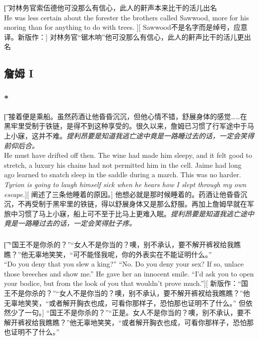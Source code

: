 \documentclass[12pt,a4paper]{article}
\begin{document}
\subsubsection{}\label{3.0.4}\t[
	对林务官索伍德他可没那么有信心，此人的鼾声本来比干的活儿出名\\
	He was less certain about the forester the brothers called Sawwood, more for his snoring than for anything to do with trees. ][
	Sawwood不是名字而是绰号，应意译。新版作：]
	对林务官“锯木响”他可没那么有信心，此人的鼾声比干的活儿更出名
	
	
\subsection{詹姆 I}
\subsubsection{\color{red}*}\t[
	接着便是乘船。虽然药酒让他昏昏沉沉，但他心情不错，舒展身体的感觉……在黑牢里受制于铁链，是得不到这种享受的。很久以来，詹姆已习惯了行军途中于马上小寐，这并不难。\emph{提利昂要是知道我逃亡途中竟是一路睡过去的话，一定会笑得前仰后合。}\\
	He must have drifted off then. The wine had made him sleepy, and it felt good to stretch, a luxury his chains had not permitted him in the cell. Jaime had long ago learned to snatch sleep in the saddle during a march. This was no harder. \emph{Tyrion is going to laugh himself sick when he hears how I slept through my own escape.}][
	阐述了三条他睡着的原因。]
	他想必就是那时候睡着的。药酒让他昏昏沉沉，不再受制于黑牢里的铁链，得以舒展身体又是那么舒服。再加上詹姆早就在军旅中习惯了马上小寐，船上可不至于比马上更难入眠。\emph{提利昂要是知道我逃亡途中竟是一路睡过去的话，一定会笑得肚子疼。}
	
\subsubsection{}\t[
	“国王不是你杀的？”“女人不是你当的？噢，别不承认，要不解开裤衩给我瞧瞧？”他无辜地笑笑，“可不能怪我呢，你的外表实在不能证明什么。” \\
	“Do you deny that you slew a king?” “No. Do you deny your sex? If so, unlace those breeches and show me.” He gave her an innocent smile. “I'd ask you to open your bodice, but from the look of you that wouldn't prove much.”][
	新版作：“国王不是你杀的？”“女人不是你当的？噢，别不承认，要不解开裤衩给我瞧瞧？”他无辜地笑笑，“或者解开胸衣也成，可看你那样子，恐怕那也证明不了什么。” 但依然少了一句。]
	“国王不是你杀的？”“正是。女人不是你当的？噢，别不承认，要不解开裤衩给我瞧瞧？”他无辜地笑笑，“或者解开胸衣也成，可看你那样子，恐怕那也证明不了什么。”
	
\end{document}

